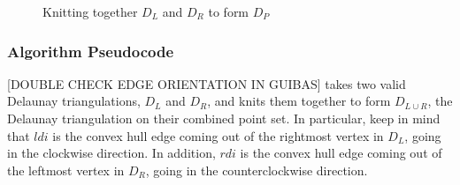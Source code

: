 \documentclass[12pt,twoside]{reedthesis}
\begin{document}
      \begin{figure}[!htb]
        \ContinuedFloat
        \centering
        \begin{subtable}{\textwidth}
          \centering
          
          \caption{We continue in this manner until we reach the ``top'', that is, until the point when we reach the upper common tangent, shown here as $uct$. This will occur when both $l$ and $r$ are invalid.}
          \label{fig:del_knit12}
        \end{subtable}

        \begin{subtable}{\textwidth}
          \centering
          
          \caption{The finished diagram, $D_{P}$}
          \label{fig:del_knit_done}
        \end{subtable}
        \caption{Knitting together $D_{L}$ and $D_{R}$ to form $D_{P}$}
        \label{fig:del_knit_all}
      \end{figure}

    \subsubsection{Algorithm Pseudocode} %
    \label{ssub:algorithm_pseudocode}

      [DOUBLE CHECK EDGE ORIENTATION IN GUIBAS] takes two valid Delaunay triangulations, $D_{L}$ and $D_{R}$, and knits them together to form $D_{L \cup R}$, the Delaunay triangulation on their combined point set. In particular, keep in mind that $ldi$ is the convex hull edge coming out of the rightmost vertex in $D_{L}$, going in the clockwise direction. In addition, $rdi$ is the convex hull edge coming out of the leftmost vertex in $D_{R}$, going in the counterclockwise direction.\par
\end{document}
